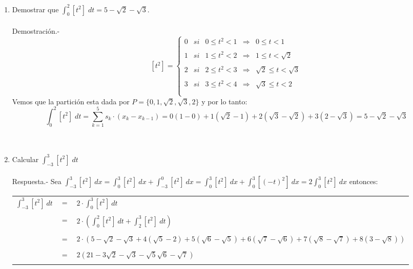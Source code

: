 \begin{enumerate}[ \bfseries 1.]
\begin{enumerate}[\bfseries (a)]
	\item Demostrar que $\displaystyle\int_{0}^{2} [t^2] \; dt = 5 - \sqrt{2} - \sqrt{3}.$\\\\
	    Demostración.-\; 
	    $$\left[t^2\right]=\left\{\begin{array}{rclcl}
		  0&si&0\leq t^2 < 1&\Rightarrow&0\leq t < 1\\
		\\1&si&1\leq t^2 < 2&\Rightarrow&1\leq t < \sqrt{2}\\
		\\2&si&2\leq t^2 < 3&\Rightarrow&\sqrt{2}\leq t < \sqrt{3}\\
		\\3&si&3\leq t^2 < 4&\Rightarrow&\sqrt{3} \leq t<2\\\\
	    \end{array}\right.$$
	    Vemos que la partición esta dada por $P=\lbrace 0,1,\sqrt{2},\sqrt{3},2 \rbrace$ y por lo tanto:
	    $$\displaystyle\int_{0}^{2} \left[t^2\right] \; dt = \sum\limits_{k=1}^{5} s_k \cdot (x_k - x_{k-1}) = 0(1-0)+1(\sqrt{2}-1) + 2(\sqrt{3}-\sqrt{2}) + 3(2-\sqrt{3})=5 - \sqrt{2} - \sqrt{3}$$\\\\
	
	\item Calcular $\displaystyle\int_{-3}^{3} \left[ t^2 \right] \; dt$\\\\
	    Respuesta.-\; Sea $\displaystyle\int_{-3}^{3} [t^{2}] \ dx = \int_{0}^{3} [t^{2}] \ dx + \int_{-3}^{0} [t^{2}] \ dx = \int_{0}^{3} [t^{2}] \ dx + \int_{0}^{3} [(-t)^{2}] \ dx = 2 \int_{0}^{3} [t^{2}] \ dx$ entonces:\\

	    \begin{tabular}{rcl}
		$\displaystyle\int_{-3}^{3} \left[t^2\right] \ dt$&$=$&$ \displaystyle2\cdot \int_{0}^{3} \left[t^2\right] \ dt$\\\\
		&$=$&$\displaystyle2\cdot \left( \int_{0}^{2} \left[t^2\right] \ dt + \int_{2}^{3} \left[t^2\right] \ dt\right)$\\\\
		&$=$&$ 2\cdot \left(5 - \sqrt{2} - \sqrt{3} + 4(\sqrt{5}-2) + 5(\sqrt{6}-\sqrt{5}) + 6(\sqrt{7} - \sqrt{6}) + 7(\sqrt{8} - \sqrt{7}) + 8(3 - \sqrt{8})\right)$\\\\
		&$=$&$2\left(21 - 3\sqrt{2} - \sqrt{3} - \sqrt{5} \sqrt{6} - \sqrt{7}\right)$\\\\
	    \end{tabular}


\end{enumerate}
\end{enumerate}
